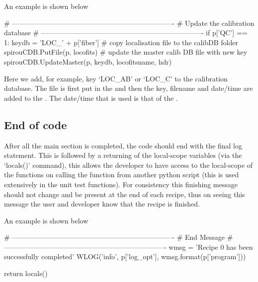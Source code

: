 \vspace{0.5cm}
\begin{minipage}{\textwidth}
\noindent An example is shown below
\begin{pythonbox}
# ----------------------------------------------------------------------
# Update the calibration database
# ----------------------------------------------------------------------
if p['QC'] == 1:
    keydb = 'LOC_' + p['fiber']
    # copy localisation file to the calibDB folder
    spirouCDB.PutFile(p, locofits)
    # update the master calib DB file with new key
    spirouCDB.UpdateMaster(p, keydb, locofitsname, hdr)
\end{pythonbox}
\begin{note}
Here we add, for example, key `LOC\_AB' or `LOC\_C' to the calibration database. The file is first put in the  and then the key, filename and date/time are added to the \masterCALIBDBfile. The date/time that is used is that of the .
\end{note}
\end{minipage}

\subsection{End of code}
\label{ch:the_recipes:gen_layout:end}

After all the main section is completed, the code should end with the final log statement. This is followed by a returning of the local-scope variables (via the `locals()' command), this allows the developer to have access to the local-scope of the functions on calling the function from another python script (this is used extensively in the unit test functions). For consistency this finishing message should not change and be present at the end of each recipe, thus on seeing this message the user and developer know that the recipe is finished.

\vspace{0.5cm}
\begin{minipage}{\textwidth}
\noindent An example is shown below
\begin{pythonbox}
# ----------------------------------------------------------------------
# End Message
# ----------------------------------------------------------------------
wmsg = 'Recipe {0} has been successfully completed'
WLOG('info', p['log_opt'], wmsg.format(p['program']))

return locals()
\end{pythonbox}
\end{minipage}

